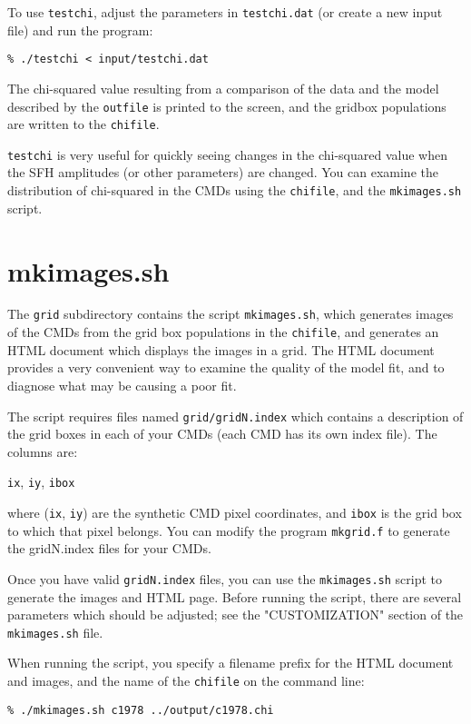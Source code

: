 \documentclass[12pt]{book}
\def\ttg{\tt\color{DarkGreen}}
\def\tto{\tt\color{myOrange}}
\begin{document}
\medskip
To use {\ttg testchi}, adjust the parameters in {\ttg testchi.dat} (or 
create a new input file) and run the program:

\medskip\noindent
{\ttg \% ./testchi < input/testchi.dat}

\medskip
The chi-squared value resulting from a comparison of the data and the 
model described by the {\tto outfile} is printed to the screen, and 
the gridbox populations are written to the {\tto chifile}.  

{\ttg testchi} is very useful for quickly seeing changes in the 
chi-squared value when the SFH amplitudes (or other parameters) are 
changed.  You can examine the distribution of chi-squared in the CMDs 
using the {\tto chifile}, and the {\ttg mkimages.sh} script.


\chapter{mkimages.sh}\label{ch:grid}

The {\ttg grid} subdirectory contains the script {\ttg mkimages.sh},
which generates images of the CMDs from the grid box populations in 
the {\tto chifile}, and generates an HTML document which displays the 
images in a grid.  The HTML document provides a very convenient way to 
examine the quality of the model fit, and to diagnose what may be 
causing a poor fit.

The script requires files named {\ttg grid/gridN.index} which 
contains a description of the grid boxes in each of your CMDs
(each CMD has its own index file). The columns are: 

\medskip\noindent
{\ttg ix}, {\ttg iy}, {\ttg ibox}

\medskip
\noindent
where ({\ttg ix}, {\ttg iy}) are the synthetic CMD pixel coordinates, 
and {\ttg ibox} is the grid box to which that pixel belongs.  You can 
modify the program {\ttg mkgrid.f} to generate the gridN.index files 
for your CMDs.

Once you have valid {\ttg gridN.index} files, you can use the 
{\ttg mkimages.sh} script to generate the images and HTML page.  
Before running the script, there are several parameters which should 
be adjusted; see the "CUSTOMIZATION" section of the {\ttg mkimages.sh} 
file.

When running the script, you specify a filename prefix for the HTML 
document and images, and the name of the {\tto chifile} on the command 
line:

\medskip\noindent
{\ttg \% ./mkimages.sh c1978 ../output/c1978.chi}
\end{document}
